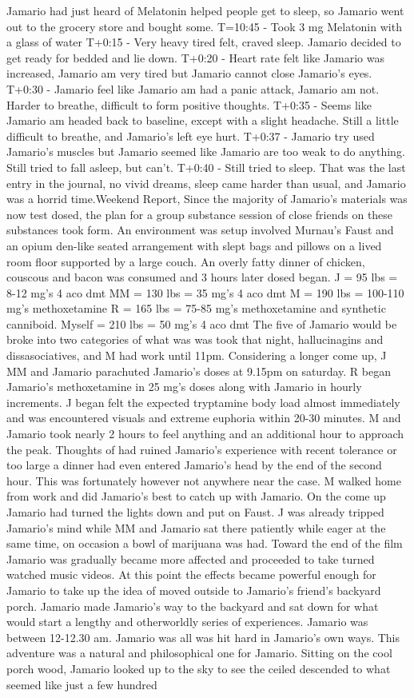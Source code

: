 \documentclass[12pt]{book}
\begin{document}
Jamario had just heard of Melatonin helped people get to sleep, so Jamario went out to the grocery store and bought some. T=10:45 - Took 3 mg Melatonin with a glass of water T+0:15 - Very heavy tired felt, craved sleep. Jamario decided to get ready for bedded and lie down. T+0:20 - Heart rate felt like Jamario was increased, Jamario am very tired but Jamario cannot close Jamario's eyes. T+0:30 - Jamario feel like Jamario am had a panic attack, Jamario am not. Harder to breathe, difficult to form positive thoughts. T+0:35 - Seems like Jamario am headed back to baseline, except with a slight headache. Still a little difficult to breathe, and Jamario's left eye hurt. T+0:37 - Jamario try used Jamario's muscles but Jamario seemed like Jamario are too weak to do anything. Still tried to fall asleep, but can't. T+0:40 - Still tried to sleep. That was the last entry in the journal, no vivid dreams, sleep came harder than usual, and Jamario was a horrid time.Weekend Report, Since the majority of Jamario's materials was now test dosed, the plan for a group substance session of close friends on these substances took form. An environment was setup involved Murnau's Faust and an opium den-like seated arrangement with slept bags and pillows on a lived room floor supported by a large couch. An overly fatty dinner of chicken, couscous and bacon was consumed and 3 hours later dosed began. J = 95 lbs = 8-12 mg's 4 aco dmt MM = 130 lbs = 35 mg's 4 aco dmt M = 190 lbs = 100-110 mg's methoxetamine R = 165 lbs = 75-85 mg's methoxetamine and synthetic canniboid. Myself = 210 lbs = 50 mg's 4 aco dmt The five of Jamario would be broke into two categories of what was was took that night, hallucinagins and dissasociatives, and M had work until 11pm. Considering a longer come up, J MM and Jamario parachuted Jamario's doses at 9.15pm on saturday. R began Jamario's methoxetamine in 25 mg's doses along with Jamario in hourly increments. J began felt the expected tryptamine body load almost immediately and was encountered visuals and extreme euphoria within 20-30 minutes. M and Jamario took nearly 2 hours to feel anything and an additional hour to approach the peak. Thoughts of had ruined Jamario's experience with recent tolerance or too large a dinner had even entered Jamario's head by the end of the second hour. This was fortunately however not anywhere near the case. M walked home from work and did Jamario's best to catch up with Jamario. On the come up Jamario had turned the lights down and put on Faust. J was already tripped Jamario's mind while MM and Jamario sat there patiently while eager at the same time, on occasion a bowl of marijuana was had. Toward the end of the film Jamario was gradually became more affected and proceeded to take turned watched music videos. At this point the effects became powerful enough for Jamario to take up the idea of moved outside to Jamario's friend's backyard porch. Jamario made Jamario's way to the backyard and sat down for what would start a lengthy and otherworldly series of experiences. Jamario was between 12-12.30 am. Jamario was all was hit hard in Jamario's own ways. This adventure was a natural and philosophical one for Jamario. Sitting on the cool porch wood, Jamario looked up to the sky to see the ceiled descended to what seemed like just a few hundred 
\end{document}
